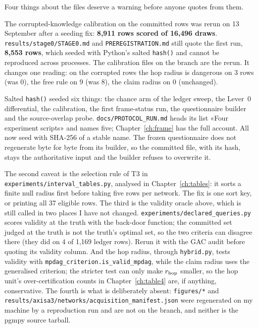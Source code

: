 Four things about the files deserve a warning before anyone quotes from them.

\begin{medido}
The corrupted-knowledge calibration on the committed rows was rerun on 13 September after a seeding
fix: \textbf{8,911 rows scored of 16,496 draws}. \texttt{results/\allowbreak{}stage0/\allowbreak{}STAGE0.md} and
\texttt{PREREGISTRATION.md} still quote the first run, \textbf{8,553 rows}, which seeded with Python's
salted \texttt{hash()} and cannot be reproduced across processes. The calibration files on the branch
are the rerun. It changes one reading: on the corrupted rows the hop radius is dangerous on 3 rows
(was 0), the free rule on 9 (was 8), the claim radius on 0 (unchanged).
\end{medido}

Salted \texttt{hash()} seeded six things: the chance arm of the ledger sweep, the Lever~0
differential, the calibration, the first frame-status run, the questionnaire builder and the
source-overlap probe. \texttt{docs/PROTOCOL\_RUN.md} heads its list «Four experiment scripts» and
names five; Chapter~\ref{ch:frame} has the full account. All now seed with SHA-256 of a stable
name. The frozen questionnaire does not regenerate byte for byte
from its builder, so the committed file, with its hash, stays the authoritative input and the
builder refuses to overwrite it.

The second caveat is the selection rule of T3 in \texttt{experiments/\allowbreak{}interval\_tables.py}, analysed
in Chapter~\ref{ch:tables}: it sorts a finite null radius first before taking five rows per network.
The fix is one sort key, or printing all 37 eligible rows. The third is the validity oracle above,
which is still called in two places I have not changed. \texttt{experiments/\allowbreak{}declared\_queries.py}
scores validity at the truth with the back-door function; the committed set judged at the truth is
not the truth's optimal set, so the two criteria can disagree there (they did on 4 of 1,169 ledger
rows). Rerun it with the GAC audit before quoting its validity column. And the hop radius, through
\texttt{hybrid.py}, tests validity with \texttt{mpdag\_criterion.is\_valid\_mpdag}, while the claim
radius uses the generalised criterion; the stricter test can only make $r_{\mathrm{hop}}$ smaller, so the hop
unit's over-certification counts in Chapter~\ref{ch:table4} are, if anything, conservative.
The fourth is what is deliberately absent: \texttt{figures/*} and
\texttt{results/\allowbreak{}axisa3/\allowbreak{}networks/\allowbreak{}acquisition\_manifest.json} were regenerated on my machine by a
reproduction run and are not on the branch, and neither is the pgmpy source tarball.

